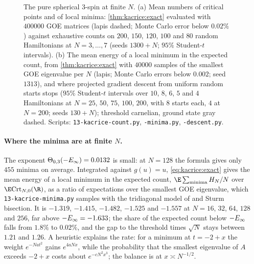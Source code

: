 \begin{refsection}
\begin{figure}[t]
\begin{fullwidth}
\end{fullwidth}
\caption{The pure spherical $3$-spin at finite $N$. (a) Mean numbers of critical points and of local minima: \cref{thm:kacrice:exact} evaluated with $400000$ GOE matrices (lapis dashed; Monte Carlo error below $0.02\%$) against exhaustive counts on $200$, $150$, $120$, $100$ and $80$ random Hamiltonians at $N=3,\dots,7$ (seeds $1300+N$; $95\%$ Student-$t$ intervals). (b) The mean energy of a local minimum in the expected count, from \cref{thm:kacrice:exact} with $40000$ samples of the smallest GOE eigenvalue per $N$ (lapis; Monte Carlo errors below $0.002$; seed $1313$), and where projected gradient descent from uniform random starts stops ($95\%$ Student-$t$ intervals over $10$, $8$, $6$, $5$ and $4$ Hamiltonians at $N=25$, $50$, $75$, $100$, $200$, with $8$ starts each, $4$ at $N=200$; seeds $130+N$); threshold carnelian, ground state gray dashed. Scripts: \texttt{13-kacrice-count.py}, \texttt{-minima.py}, \texttt{-descent.py}.}\label{fig:kacrice:count}
\end{figure}

\paragraph{Where the minima are at finite $N$.} The exponent $\Theta_{0,3}(-E_\infty)=0.0132$ is small: at $N=128$ the formula gives only $455$ minima on average. Integrated against $g(u)=u$, \eqref{eq:kacrice:exact} gives the mean energy of a local minimum in the expected count, $\E\sum_{\text{minima}}H_N/N$ over $\E\kacriceCrt_{N,0}(\R)$, as a ratio of expectations over the smallest GOE eigenvalue, which \texttt{13-kacrice-minima.py} samples with the tridiagonal model of \textcite{DumitriuEdelman2002} and Sturm bisection. It is $-1.319$, $-1.415$, $-1.482$, $-1.525$ and $-1.557$ at $N=16$, $32$, $64$, $128$ and $256$, far above $-E_\infty=-1.633$; the share of the expected count below $-E_\infty$ falls from $1.8\%$ to $0.02\%$, and the gap to the threshold times $\sqrt N$ stays between $1.21$ and $1.26$. A heuristic explains the rate: for a minimum at $t=-2+x$ the weight $e^{-Nat^2}$ gains $e^{4aNx}$, while the probability that the smallest eigenvalue of $A$ exceeds $-2+x$ costs about $e^{-cN^2x^3}$; the balance is at $x\asymp N^{-1/2}$.


\end{refsection}
